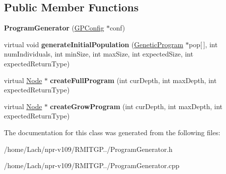 \subsection*{Public Member Functions}
\begin{DoxyCompactItemize}
\item 
\hypertarget{classProgramGenerator_a141581adb35baf3221ab0ce48d3836c3}{}\label{classProgramGenerator_a141581adb35baf3221ab0ce48d3836c3} 
{\bfseries Program\+Generator} (\hyperlink{classGPConfig}{G\+P\+Config} $\ast$conf)
\item 
\hypertarget{classProgramGenerator_a13e451a9e6685393cba48c19504852f5}{}\label{classProgramGenerator_a13e451a9e6685393cba48c19504852f5} 
virtual void {\bfseries generate\+Initial\+Population} (\hyperlink{classGeneticProgram}{Genetic\+Program} $\ast$pop\mbox{[}$\,$\mbox{]}, int num\+Individuals, int min\+Size, int max\+Size, int expected\+Size, int expected\+Return\+Type)
\item 
\hypertarget{classProgramGenerator_a987665263dd66c17e76857df8eda59b4}{}\label{classProgramGenerator_a987665263dd66c17e76857df8eda59b4} 
virtual \hyperlink{classNode}{Node} $\ast$ {\bfseries create\+Full\+Program} (int cur\+Depth, int max\+Depth, int expected\+Return\+Type)
\item 
\hypertarget{classProgramGenerator_a5774f10d0ad921abcdb5072071a63f34}{}\label{classProgramGenerator_a5774f10d0ad921abcdb5072071a63f34} 
virtual \hyperlink{classNode}{Node} $\ast$ {\bfseries create\+Grow\+Program} (int cur\+Depth, int max\+Depth, int expected\+Return\+Type)
\end{DoxyCompactItemize}


The documentation for this class was generated from the following files\+:\begin{DoxyCompactItemize}
\item 
/home/\+Lach/npr-\/v109/\+R\+M\+I\+T\+G\+P../Program\+Generator.\+h\item 
/home/\+Lach/npr-\/v109/\+R\+M\+I\+T\+G\+P../Program\+Generator.\+cpp\end{DoxyCompactItemize}
